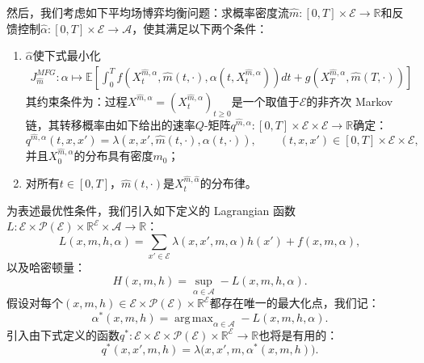 \documentclass{amsproc}
\theoremstyle{definition}
\theoremstyle{remark}
\numberwithin{equation}{section}
\newcommand{\EE}{{\mathbb E}}
\newcommand{\RR}{{\mathbb R}}
\newcommand{\cA}{{\mathcal A}}
\newcommand{\cE}{{\mathcal E}}
\newcommand{\cP}{{\mathcal P}}
\newcommand{\ctrl}{\alpha}
\DeclareMathOperator*{\argmax}{arg\,max}
\begin{document}
然后，我们考虑如下平均场博弈均衡问题：求概率密度流$\hat{m}: [0,T] \times \cE \to \RR$和反馈控制$\hat{\ctrl}: [0,T] \times \cE \to \cA$，使其满足以下两个条件：
\begin{enumerate}
	\item $\hat{\ctrl}$使下式最小化
\begin{align*}
	J^{MFG}_{\hat{m}}: \ctrl \mapsto  \EE \left[\int_0^T f(X_t^{\hat{m}, \ctrl}, \hat{m}(t,\cdot), \ctrl(t,X_t^{\hat{m}, \ctrl}) ) dt + g(X_T^{\hat{m}, \ctrl}, \hat{m}(T,\cdot)) \right]
\end{align*}
其约束条件为：过程$X^{\hat{m}, \ctrl} = (X_t^{\hat{m}, \ctrl})_{t \ge 0}$是一个取值于$\cE$的非齐次 Markov 链，其转移概率由如下给出的速率$Q$-矩阵$q^{\hat{m}, \ctrl}: [0,T] \times \cE \times \cE \to \RR$确定：
\begin{equation}
\label{AMS-num-eq:q-finite-MFG}
	q^{\hat{m}, \ctrl}(t, x,x') = \lambda(x, x', \hat{m}(t,\cdot), \ctrl(t,\cdot)), \qquad (t,x,x') \in [0,T] \times \cE \times \cE,
\end{equation}
并且$X_0^{\hat{m}, \ctrl}$的分布具有密度$m_0$；
	\item 对所有$t \in [0,T]$，$\hat{m}(t,\cdot)$是$X_t^{\hat{m}, \hat{\ctrl}}$的分布律。
\end{enumerate}

为表述最优性条件，我们引入如下定义的 Lagrangian 函数$L: \cE \times \cP(\cE) \times \RR^\cE \times \cA \to \RR$：
$$
	L(x, m, h, \ctrl) = \sum_{x' \in \cE} \lambda(x, x', m, \ctrl) h(x') + f(x, m, \ctrl) ,
$$
以及哈密顿量：
$$
	H(x, m, h) = \sup_{\ctrl \in \cA} -L(x, m, h, \ctrl).
$$ 
假设对每个$(x, m, h) \in \cE \times \cP(\cE) \times \RR^\cE$都存在唯一的最大化点，我们记：
\begin{equation}
\label{AMS-num-eq:finiteMFG-ctrl-argmax}
	\ctrl^*(x, m, h) = \argmax_{\ctrl \in \cA} -L(x, m, h, \ctrl).
\end{equation}
引入由下式定义的函数$q^*: \cE \times \cE \times \cP(\cE) \times \RR^\cE \to \RR$也将是有用的：
$$
	q^*(x,x',m,h) = \lambda\big(x, x', m, \ctrl^*(x,m, h)\big).
$$
\end{document}
